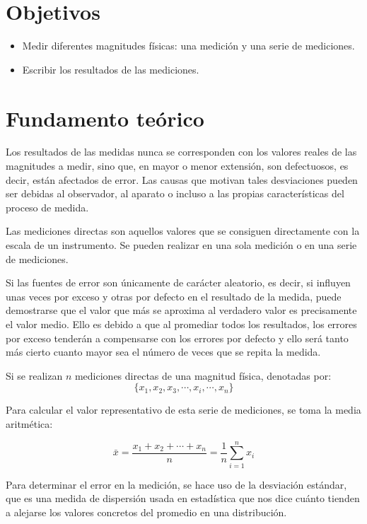 \documentclass[letter,11pt]{article}
\begin{document}
\section{Objetivos}
\begin{itemize}
\item Medir diferentes magnitudes físicas: una medición y una serie de
mediciones.
\item Escribir los resultados de las mediciones.
\end{itemize}

\section{Fundamento teórico}
Los resultados de las medidas nunca se corresponden con los valores reales de
las magnitudes a medir, sino que, en mayor o menor extensión, son defectuosos,
es decir, están afectados de error. Las causas que motivan tales desviaciones
pueden ser debidas al observador, al aparato o incluso a las propias
características del proceso de medida.

Las mediciones directas son aquellos valores que se consiguen directamente con
la escala de un instrumento. Se pueden realizar en una sola medición o en una
serie de mediciones.

Si las fuentes de error son únicamente de carácter aleatorio, es decir, si
influyen unas veces por exceso y otras por defecto en el resultado de la medida,
puede demostrarse que el valor que más se aproxima al verdadero valor es
precisamente el valor medio. Ello es debido a que al promediar todos los
resultados, los errores por exceso tenderán a compensarse con los errores por
defecto y ello será tanto más cierto cuanto mayor sea el número de veces que se
repita la medida.

Si se realizan $n$ mediciones directas de una magnitud física, denotadas
por:
\begin{equation}
    \{x_1,x_2,x_3,\cdots,x_i,\cdots,x_n\}
\end{equation}

Para calcular el valor representativo de esta serie de mediciones, se toma la
media aritmética:

\begin{equation}
    \bar{x} = \frac{x_1+x_2+\cdots+x_n}{n} = \frac{1}{n}\sum_{i=1}^{n} x_i
\end{equation}

Para determinar el error en la medición, se hace uso de la desviación estándar,
que es una medida de dispersión usada en estadística que nos dice cuánto tienden
a alejarse los valores concretos del promedio en una distribución.
\end{document}
